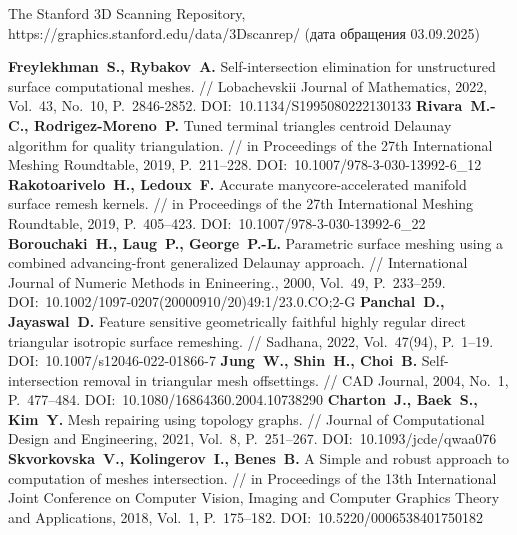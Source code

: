 \begin{thebibliography}{99}
 The Stanford 3D Scanning Repository, https://graphics.stanford.edu/data/3Dscanrep/ (дата обращения 03.09.2025)


\textbf{Freylekhman~S., Rybakov~A.} Self-intersection elimination for unstructured surface computational meshes. // Lobachevskii Journal of Mathematics, 2022, Vol.~43, No.~10, P.~2846-2852. DOI:~10.1134/S1995080222130133
\textbf{Rivara~M.-C., Rodrigez-Moreno~P.} Tuned terminal triangles centroid Delaunay algorithm for quality triangulation. // in Proceedings of the 27th International Meshing Roundtable, 2019, P.~211–228. DOI:~10.1007/978-3-030-13992-6\_12
\textbf{Rakotoarivelo~H., Ledoux~F.} Accurate manycore-accelerated manifold surface remesh kernels. // in Proceedings of the 27th International Meshing Roundtable, 2019, P.~405–423. DOI:~10.1007/978-3-030-13992-6\_22
\textbf{Borouchaki~H., Laug~P., George~P.-L.} Parametric surface meshing using a combined advancing-front generalized Delaunay approach. // International Journal of Numeric Methods in Enineering., 2000, Vol.~49, P.~233–259. DOI:~10.1002/1097-0207(20000910/20)49:1/23.0.CO;2-G
\textbf{Panchal~D., Jayaswal~D.} Feature sensitive geometrically faithful highly regular direct triangular isotropic surface remeshing. // Sadhana, 2022, Vol.~47(94), P.~1–19. DOI:~10.1007/s12046-022-01866-7
\textbf{Jung~W., Shin~H., Choi~B.} Self-intersection removal in triangular mesh offsettings. // CAD Journal, 2004, No.~1, P.~477–484. DOI:~10.1080/16864360.2004.10738290
\textbf{Charton~J., Baek~S., Kim~Y.} Mesh repairing using topology graphs. // Journal of Computational Design and Engineering, 2021, Vol.~8, P.~251–267. DOI:~10.1093/jcde/qwaa076
\textbf{Skvorkovska~V., Kolingerov~I., Benes~B.} A Simple and robust approach to computation of meshes intersection. // in Proceedings of the 13th International Joint Conference on Computer Vision, Imaging and Computer Graphics Theory and Applications, 2018, Vol.~1, P.~175–182. DOI:~10.5220/0006538401750182



\end{thebibliography}
